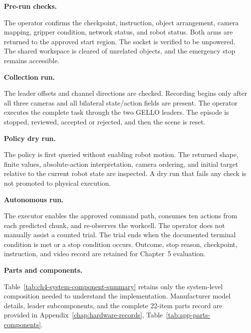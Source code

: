 \medskip
\noindent\textbf{Pre-run checks.}

The operator confirms the checkpoint, instruction, object arrangement, camera mapping, gripper condition, network status, and robot status. Both arms are returned to the approved start region. The socket is verified to be unpowered. The shared workspace is cleared of unrelated objects, and the emergency stop remains accessible.

\medskip
\noindent\textbf{Collection run.}

The leader offsets and channel directions are checked. Recording begins only after all three cameras and all bilateral state/action fields are present. The operator executes the complete task through the two GELLO leaders. The episode is stopped, reviewed, accepted or rejected, and then the scene is reset.

\medskip
\noindent\textbf{Policy dry run.}

The policy is first queried without enabling robot motion. The returned shape, finite values, absolute-action interpretation, camera ordering, and initial target relative to the current robot state are inspected. A dry run that fails any check is not promoted to physical execution.

\medskip
\noindent\textbf{Autonomous run.}

The executor enables the approved command path, consumes ten actions from each predicted chunk, and re-observes the workcell. The operator does not manually assist a counted trial. The trial ends when the documented terminal condition is met or a stop condition occurs. Outcome, stop reason, checkpoint, instruction, and video record are retained for Chapter~5 evaluation.

\medskip
\noindent\textbf{Parts and components.}

Table~\ref{tab:ch4-system-component-summary} retains only the system-level composition needed to understand the implementation. Manufacturer model details, leader subcomponents, and the complete 22-item parts record are provided in Appendix~\ref{chap:hardware-records}, Table~\ref{tab:app-parts-components}.

